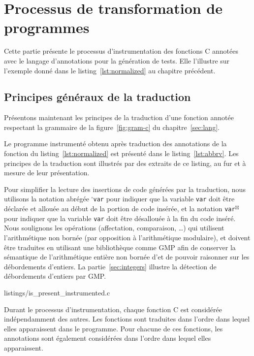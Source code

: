 \section{Processus de transformation de programmes}
\label{sec:process}


Cette partie présente le processus d'instrumentation des fonctions C annotées
avec le langage d'annotations \eacsl pour la génération de tests.
Elle l'illustre sur l'exemple donné dans le listing~\ref{lst:normalized} au
chapitre précédent.


\subsection{Principes généraux de la traduction}
\label{sec:principles}


Présentons maintenant les principes de la traduction d'une fonction annotée
respectant la grammaire de la figure~\ref{fig:gram-c} du
chapitre~\ref{sec:lang}.

Le programme instrumenté obtenu après traduction des annotations de la fonction
du listing~\ref{lst:normalized} est présenté dans le listing~\ref{lst:abbrv}.
Les principes de la traduction sont illustrés par des extraits de ce listing,
au fur et à mesure de leur présentation.

Pour simplifier la lecture des insertions de code générées par la traduction,
nous utilisons la notation abrégée ${}^{\square}$\lstinline'var' pour indiquer
que la variable \lstinline'var' doit être déclarée et allouée
au début de la portion de code insérée, et la notation
\lstinline'var'${}^{\boxtimes}$ pour indiquer que la variable \lstinline'var' doit
être désallouée à la fin du code inséré.
Nous soulignons les opérations (affectation, comparaison, \dots) qui utilisent
l'arithmétique non bornée (par opposition à l'arithmétique modulaire), et
doivent être traduites en utilisant une bibliothèque comme GMP afin de conserver
la sémantique de l'arithmétique entière non bornée d'\eacsl et de pouvoir
raisonner sur les débordements d'entiers.
La partie~\ref{sec:integers} illustre la détection de débordements d'entiers par
GMP.



                {listings/is_present_instrumented.c}


Durant le processus d'instrumentation, chaque fonction C est considérée
indépendamment des autres.
Les fonctions sont traduites dans l'ordre dans lequel elles apparaissent dans le
programme.
Pour chacune de ces fonctions, les annotations \eacsl sont également considérées
dans l'ordre dans lequel elles apparaissent.

